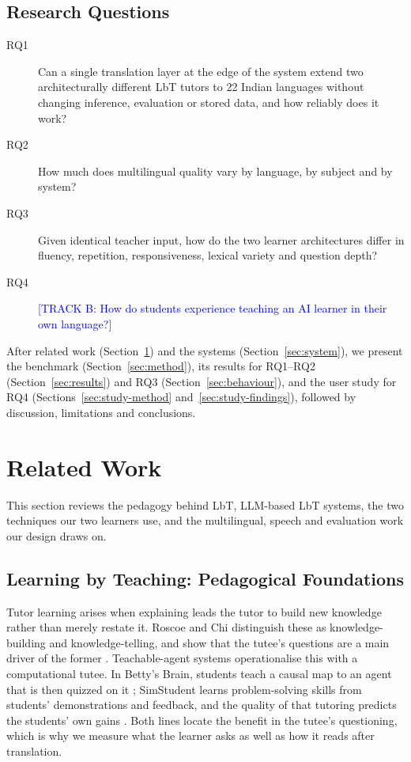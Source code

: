 \documentclass[pdflatex,sn-mathphys-num]{sn-jnl}%
\newcommand{\trackb}[1]{\textcolor{blue}{[TRACK B: #1]}}
\theoremstyle{thmstyleone}%
\theoremstyle{thmstyletwo}%
\theoremstyle{thmstylethree}%
\begin{document}
\subsection{Research Questions}\label{sec:rqs}

\begin{description}
\item[RQ1] Can a single translation layer at the edge of the system extend two architecturally
different LbT tutors to 22 Indian languages without changing inference, evaluation or stored data,
and how reliably does it work?
\item[RQ2] How much does multilingual quality vary by language, by subject and by system?
\item[RQ3] Given identical teacher input, how do the two learner architectures differ in fluency,
repetition, responsiveness, lexical variety and question depth?
\item[RQ4] \trackb{How do students experience teaching an AI learner in their own language?}
\end{description}

After related work (Section~\ref{sec:related}) and the systems (Section~\ref{sec:system}), we present
the benchmark (Section~\ref{sec:method}), its results for RQ1--RQ2 (Section~\ref{sec:results}) and RQ3
(Section~\ref{sec:behaviour}), and the user study for RQ4 (Sections~\ref{sec:study-method}
and~\ref{sec:study-findings}), followed by discussion, limitations and conclusions.

\section{Related Work}\label{sec:related}

This section reviews the pedagogy behind LbT, LLM-based LbT systems, the two techniques our two
learners use, and the multilingual, speech and evaluation work our design draws on.

\subsection{Learning by Teaching: Pedagogical Foundations}

Tutor learning arises when explaining leads the tutor to build new knowledge rather than merely
restate it. Roscoe and Chi distinguish these as knowledge-building and knowledge-telling, and show
that the tutee's questions are a main driver of the former \cite{roscoe2007}. Teachable-agent
systems operationalise this with a computational tutee. In Betty's Brain, students teach a causal
map to an agent that is then quizzed on it \cite{biswas2005,blair2007}; SimStudent learns
problem-solving skills from students' demonstrations and feedback, and the quality of that tutoring
predicts the students' own gains \cite{matsuda2013}. Both lines locate the benefit in the tutee's
questioning, which is why we measure what the learner asks as well as how it reads after
translation.
\end{document}
